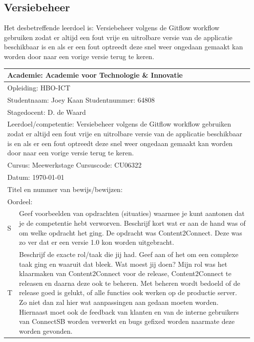 \clearpage

\subsection{Versiebeheer}
Het desbetreffende leerdoel is: Versiebeheer volgens de Gitflow workflow gebruiken zodat er altijd een fout vrije en uitrolbare versie van de applicatie beschikbaar is en als er een fout optreedt deze snel weer ongedaan gemaakt kan worden door naar een vorige versie terug te keren.

\begin{tabularx}{\textwidth}{| l | X |}
\hline
\multicolumn{2}{|l|}{Academie: Academie voor Technologie \& Innovatie } \\
\hline
\multicolumn{2}{|l|}{Opleiding: HBO-ICT } \\
\hline
\multicolumn{2}{|l|}{Studentnaam: Joey Kaan \hspace{35pt} Studentnummer: 64808} \\
\hline
\multicolumn{2}{|l|}{Stagedocent: D. de Waard} \\
\hline
\multicolumn{2}{|p{\textwidth-1in}|}{Leerdoel/competentie: Versiebeheer volgens de Gitflow workflow gebruiken zodat er
altijd een fout vrije en uitrolbare versie van de applicatie beschikbaar is en als
er een fout optreedt deze snel weer ongedaan gemaakt kan worden door naar
een vorige versie terug te keren.} \\
\hline
\multicolumn{2}{|l|}{Cursus: Meewerkstage \hspace{35pt} Cursuscode: CU06322} \\
\hline
\multicolumn{2}{|l|}{Datum: \today} \\
\hline
\multicolumn{2}{|l|}{Titel en nummer van bewijs/bewijzen: } \\ [50pt]
\hline
\multicolumn{2}{|l|}{Oordeel: } \\
\hline
S & Geef voorbeelden van opdrachten (situaties) waarmee je kunt aantonen dat je de competentie hebt verworven. Beschrijf kort wat er aan de hand was of om welke opdracht het ging.
\newline
\newline
De opdracht was Content2Connect. Deze was zo ver dat er een versie 1.0 kon worden uitgebracht. \\
\hline
T & Beschrijf de exacte rol/taak die jij had. Geef aan of het om een complexe taak ging en waaruit dat bleek. Wat moest jij doen?
\newline
\newline
Mijn rol was het klaarmaken van Content2Connect voor de release, Content2Connect te releasen en daarna deze ook te beheren. Met beheren wordt bedoeld of de release goed is gelukt, of alle functies ook werken op de productie server. Zo niet dan zal hier wat aanpassingen aan gedaan moeten worden. Hiernaast moet ook de feedback van klanten en van de interne gebruikers van ConnectSB worden verwerkt en bugs gefixed worden naarmate deze worden gevonden.

\end{tabularx}
